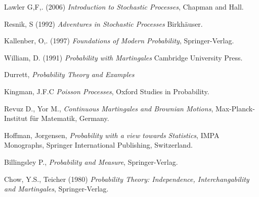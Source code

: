 \documentclass[letterpaper]{article}
\begin{document}
\begin{thebibliography}{3}
 Lawler G,F,. (2006) \textit{Introduction to Stochastic Processes}, Chapman and Hall.

 Resnik, S (1992) \textit{Adventures in Stochastic Processes} Birkhäuser.

 Kallenber, O,. (1997) \textit{Foundations of Modern Probability}, Springer-Verlag.

 William, D. (1991) \textit{Probability with Martingales} Cambridge University Press.

 Durrett,   \textit{Probability Theory and Examples}

 Kingman, J.F.C \textit{Poisson Processes}, Oxford Studies in Probability.

 Revuz D., Yor M., \textit{Continuous Martingales and Brownian Motions}, Max-Planck-Institut f\"ur Matematik, Germany.

 Hoffman, Jorgensen, \textit{Probability with a view towards Statistics}, IMPA Monographs, Springer International Publishing, Switzerland.

 Billingsley P., \textit{Probability and Measure}, Springer-Verlag.

 Chow, Y.S., Teicher (1980) \textit{Probability Theory: Independence, Interchangability and Martingales}, Springer-Verlag.
\end{thebibliography}
\end{document}
